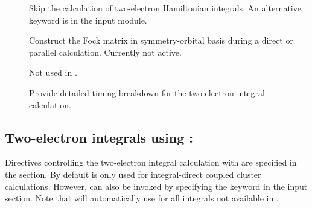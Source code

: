 \begin{description}
\item[] Skip the calculation of two-electron Hamiltonian
integrals. An alternative keyword is  in the 
input module.

\item[] Construct the Fock matrix in symmetry-orbital
basis during a direct or parallel calculation. Currently not active.

\item[] Not used in \dalton .

\item[] Provide detailed timing breakdown for the
two-electron integral calculation.
\end{description}


\subsection{Two-electron integrals using {\eri}: }
\label{ch:eri}

Directives controlling the two-electron integral calculation with {\eri}
are specified in the  section.
By default {\eri} is only used for integral-direct coupled cluster
calculations. However, {\eri} can also be invoked by specifying the
 keyword in the  input section. Note that
{\dalton} will automatically use {\twoint} for all integrals not
available in {\eri}.


